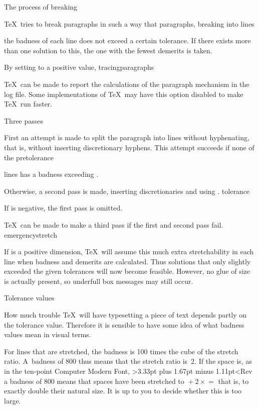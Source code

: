 \point The process of breaking

\TeX\ tries to break paragraphs in such a way that 
\term paragraphs, breaking into lines\par
the badness of each line does not exceed a certain tolerance.
If there exists more than one solution to this, the one with
the fewest demerits is taken.

By setting  to a positive value,
\csterm tracingparagraphs\par
\TeX\ can be made to report the calculations of the
paragraph mechanism in the log file. Some implementations of \TeX\
may have this option disabled to make \TeX\ run faster.

\spoint Three passes

First an attempt is made to split the paragraph into lines
without hyphenating, that is, without inserting discretionary
hyphens. This attempt succeeds if none of the
\csterm pretolerance\par
lines has a badness exceeding .

Otherwise, a second pass is made, inserting discretionaries
and using .
\csterm tolerance\par
If  is negative, the first pass is omitted.

\TeX\ can be made to make a third pass if the first and
second pass fail.
\csterm emergencystretch\par
If  is a positive dimension, 
\TeX\ will assume this much extra stretchability 
in each line when badness and demerits are calculated.
Thus solutions that only slightly exceeded the given
tolerances will now become feasible.
However, no glue of size  is
actually present, so underfull box messages
may still occur.

\spoint Tolerance values

How much
trouble \TeX\ will have typesetting a piece of text
depends partly on the tolerance value.
Therefore it is sensible to have some idea of
what badness values mean in visual terms.

For lines that are stretched, the badness is
100 times the cube of the stretch ratio.
A~badness of 800 thus means that the stretch ratio
is~2.
If the space is,
\alt
as in the ten-point Computer Modern Font,
\Ver>3.33pt plus 1.67pt minus 1.11pt<Rev
a badness of 800 means that spaces have been stretched to
\disp \n{3.33pt}${}+2\times{}$\n{1.67pt}${}={}$\n{6.66pt}\>
that is, to exactly double their natural size.
It is up to you to decide whether this is too large.

